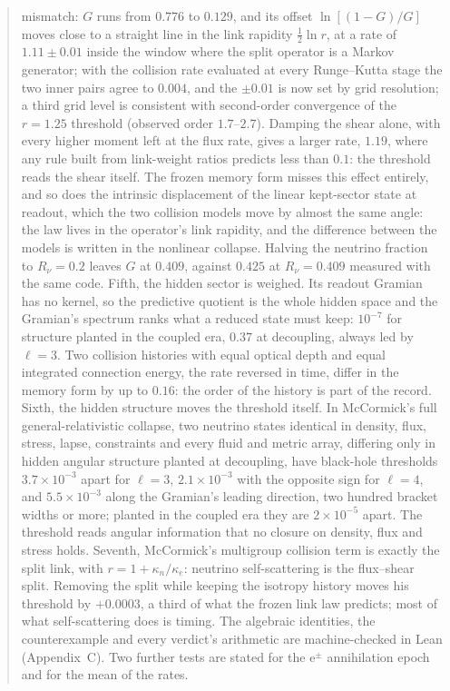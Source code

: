 \documentclass[11pt]{article}
\begin{document}
\begin{abstract}
mismatch: $G$ runs from $0.776$ to $0.129$, and its offset $\ln[(1-G)/G]$ moves close to a straight line in the link rapidity $\tfrac12\ln r$, at a rate of $1.11\pm0.01$ inside the window where the split operator is a Markov generator; with the collision rate evaluated at every Runge--Kutta stage the two inner pairs agree to $0.004$, and the $\pm0.01$ is now set by grid resolution; a third grid level is consistent with second-order convergence of the $r=1.25$ threshold (observed order $1.7$--$2.7$). Damping the shear alone, with every higher moment left at the flux rate, gives a larger rate, $1.19$, where any rule built from link-weight ratios predicts less than $0.1$: the threshold reads the shear itself. The frozen memory form misses this effect entirely, and so does the intrinsic displacement of the linear kept-sector state at readout, which the two collision models move by almost the same angle: the law lives in the operator's link rapidity, and the difference between the models is written in the nonlinear collapse. Halving the neutrino fraction to $R_\nu=0.2$ leaves $G$ at $0.409$, against $0.425$ at $R_\nu=0.409$ measured with the same code. Fifth, the hidden sector is weighed. Its readout Gramian has no kernel, so the predictive quotient is the whole hidden space and the Gramian's spectrum ranks what a reduced state must keep: $10^{-7}$ for structure planted in the coupled era, $0.37$ at decoupling, always led by $\ell=3$. Two collision histories with equal optical depth and equal integrated connection energy, the rate reversed in time, differ in the memory form by up to $0.16$: the order of the history is part of the record. Sixth, the hidden structure moves the threshold itself. In McCormick's full general-relativistic collapse, two neutrino states identical in density, flux, stress, lapse, constraints and every fluid and metric array, differing only in hidden angular structure planted at decoupling, have black-hole thresholds $3.7\times10^{-3}$ apart for $\ell=3$, $2.1\times10^{-3}$ with the opposite sign for $\ell=4$, and $5.5\times10^{-3}$ along the Gramian's leading direction, two hundred bracket widths or more; planted in the coupled era they are $2\times10^{-5}$ apart. The threshold reads angular information that no closure on density, flux and stress holds. Seventh, McCormick's multigroup collision term is exactly the split link, with $r=1+\kappa_n/\kappa_e$: neutrino self-scattering is the flux--shear split. Removing the split while keeping the isotropy history moves his threshold by $+0.0003$, a third of what the frozen link law predicts; most of what self-scattering does is timing. The algebraic identities, the counterexample and every verdict's arithmetic are machine-checked in Lean (Appendix~C). Two further tests are stated for the e$^\pm$ annihilation epoch and for the mean of the rates.
\end{abstract}
\end{document}
